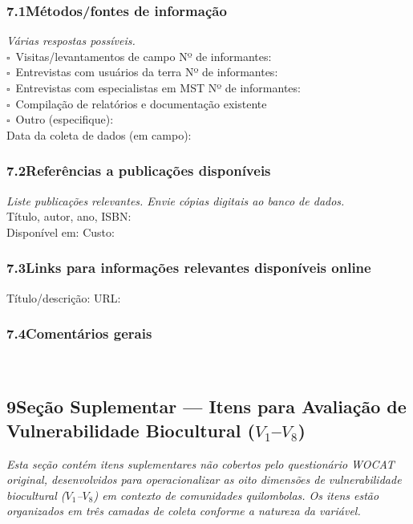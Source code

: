 \subsubsection*{7.1\quad Métodos/fontes de informação}
\textit{Várias respostas possíveis.}\\[4pt]
$\square$~Visitas/levantamentos de campo \quad Nº de informantes: \dotfill\\
$\square$~Entrevistas com usuários da terra \quad Nº de informantes: \dotfill\\
$\square$~Entrevistas com especialistas em MST \quad Nº de informantes: \dotfill\\
$\square$~Compilação de relatórios e documentação existente\\
$\square$~Outro (especifique): \dotfill\\[4pt]
Data da coleta de dados (em campo): \dotfill

\subsubsection*{7.2\quad Referências a publicações disponíveis}
\textit{Liste publicações relevantes. Envie cópias digitais ao banco de dados.}\\[4pt]
Título, autor, ano, ISBN: \dotfill\\
Disponível em: \dotfill\quad Custo: \dotfill

\subsubsection*{7.3\quad Links para informações relevantes disponíveis online}
Título/descrição: \dotfill\quad URL: \dotfill

\subsubsection*{7.4\quad Comentários gerais}
\dotfill\\[2pt]\dotfill

\subsection*{9\quad Seção Suplementar --- Itens para Avaliação de Vulnerabilidade Biocultural ($V_1$--$V_8$)}
\label{sec:suplementar}

\noindent\textit{Esta seção contém itens suplementares não cobertos pelo questionário WOCAT original, desenvolvidos para operacionalizar as oito dimensões de vulnerabilidade biocultural ($V_1$--$V_8$) em contexto de comunidades quilombolas. Os itens estão organizados em três camadas de coleta conforme a natureza da variável.}

